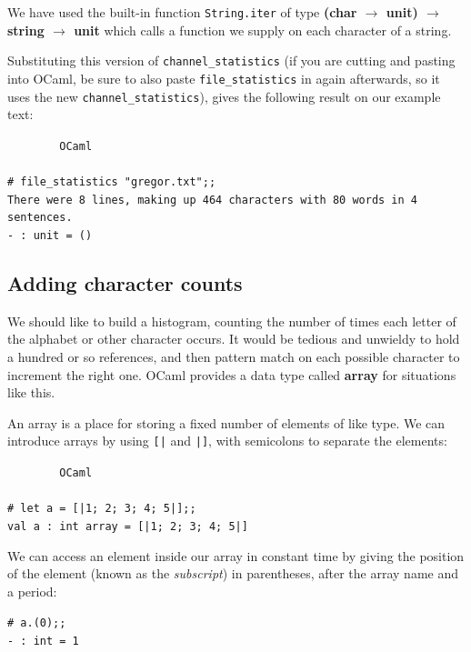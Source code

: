 \documentclass[]{book}
\newcommand{\smspace}{\vspace{4mm}}
\begin{document}
\noindent We have used the built-in function \texttt{String.iter} of type \textrm{\textbf{\textmd{(}char $\rightarrow$ unit\textmd{)} $\rightarrow$ string $\rightarrow$ unit}} which calls a function we supply on each character of a string.

Substituting this version of \texttt{channel\_statistics} (if you are cutting and pasting into OCaml, be sure to also paste \texttt{file\_statistics} in again afterwards, so it uses the new \texttt{channel\_statistics}), gives the following result on our example text:

\smspace
\noindent\verb!        OCaml!\\
\noindent\\
\noindent\verb!# file_statistics "gregor.txt";;!\\
\noindent\verb!There were 8 lines, making up 464 characters with 80 words in 4 sentences.!\\
\noindent\verb!- : unit = ()!
\smspace

\subsection*{Adding character counts}

We should like to build a histogram, counting the number of times each letter of the alphabet or other character occurs. It would be tedious and unwieldy to hold a hundred or so references, and then pattern match on each possible character to increment the right one. OCaml provides a data type called \textrm{\textbf{array}} for situations like this.

An array is a place for storing a fixed number of elements of like type. We can introduce arrays by using \texttt{[|} and \texttt{|]}, with semicolons to separate the elements:

\smspace
\noindent\verb!        OCaml!\\
\noindent\\
\noindent\verb!# let a = [|1; 2; 3; 4; 5|];;!\\
\noindent\verb!val a : int array = [|1; 2; 3; 4; 5|]!
\smspace

\noindent We can access an element inside our array in constant time by giving the position of the element (known as the \textit{subscript}) in parentheses, after the array name and a period:

\smspace
\noindent\verb!# a.(0);;!\\
\noindent\verb!- : int = 1!
\smspace
\end{document}
